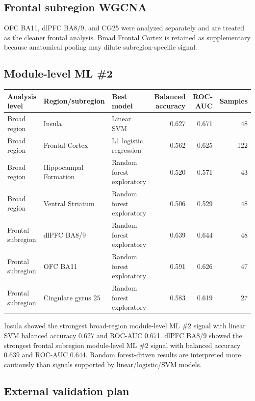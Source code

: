 \documentclass[11pt]{article}
\begin{document}
\subsection{Frontal subregion WGCNA}

OFC BA11, dlPFC BA8/9, and CG25 were analyzed separately and are treated as the cleaner frontal analysis. Broad Frontal Cortex is retained as supplementary because anatomical pooling may dilute subregion-specific signal.

\subsection{Module-level ML \#2}

\begin{center}
\begin{tabular}{lllrrr}
\toprule
Analysis level & Region/subregion & Best model & Balanced accuracy & ROC-AUC & Samples \\
\midrule
Broad region & Insula & Linear SVM & 0.627 & 0.671 & 48 \\
Broad region & Frontal Cortex & L1 logistic regression & 0.562 & 0.625 & 122 \\
Broad region & Hippocampal Formation & Random forest exploratory & 0.520 & 0.571 & 43 \\
Broad region & Ventral Striatum & Random forest exploratory & 0.506 & 0.529 & 48 \\
Frontal subregion & dlPFC BA8/9 & Random forest exploratory & 0.639 & 0.644 & 48 \\
Frontal subregion & OFC BA11 & Random forest exploratory & 0.591 & 0.626 & 47 \\
Frontal subregion & Cingulate gyrus 25 & Random forest exploratory & 0.583 & 0.619 & 27 \\
\bottomrule
\end{tabular}
\end{center}

Insula showed the strongest broad-region module-level ML \#2 signal with linear SVM balanced accuracy 0.627 and ROC-AUC 0.671. dlPFC BA8/9 showed the strongest frontal subregion module-level ML \#2 signal with balanced accuracy 0.639 and ROC-AUC 0.644. Random forest-driven results are interpreted more cautiously than signals supported by linear/logistic/SVM models.

\subsection{External validation plan}
\end{document}
